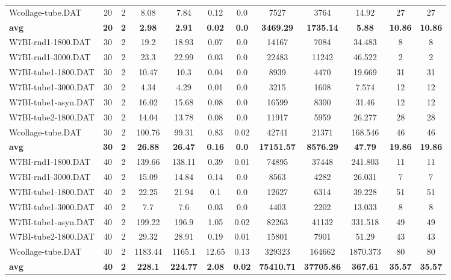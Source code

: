 \begin{table}[!h]
{\begin{tabular}{lccccccccccc}
Wcollage-tube.DAT & 20 & 2 & 8.08 & 7.84 & 0.12 & 0.0 & 7527 & 3764 & 14.92 & 27 & 27\\
\cline{1-12} \textbf{avg} & \textbf{20} & \textbf{2} & \textbf{2.98} & \textbf{2.91} & \textbf{0.02} & \textbf{0.0} & \textbf{3469.29} & \textbf{1735.14} & \textbf{5.88} & \textbf{10.86} & \textbf{10.86} \\ \cline{1-12}
W7BI-rnd1-1800.DAT & 30 & 2 & 19.2 & 18.93 & 0.07 & 0.0 & 14167 & 7084 & 34.483 & 8 & 8\\
W7BI-rnd1-3000.DAT & 30 & 2 & 23.3 & 22.99 & 0.03 & 0.0 & 22483 & 11242 & 46.522 & 2 & 2\\
W7BI-tube1-1800.DAT & 30 & 2 & 10.47 & 10.3 & 0.04 & 0.0 & 8939 & 4470 & 19.669 & 31 & 31\\
W7BI-tube1-3000.DAT & 30 & 2 & 4.34 & 4.29 & 0.01 & 0.0 & 3215 & 1608 & 7.574 & 12 & 12\\
W7BI-tube1-asyn.DAT & 30 & 2 & 16.02 & 15.68 & 0.08 & 0.0 & 16599 & 8300 & 31.46 & 12 & 12\\
W7BI-tube2-1800.DAT & 30 & 2 & 14.04 & 13.78 & 0.08 & 0.0 & 11917 & 5959 & 26.277 & 28 & 28\\
Wcollage-tube.DAT & 30 & 2 & 100.76 & 99.31 & 0.83 & 0.02 & 42741 & 21371 & 168.546 & 46 & 46\\
\cline{1-12} \textbf{avg} & \textbf{30} & \textbf{2} & \textbf{26.88} & \textbf{26.47} & \textbf{0.16} & \textbf{0.0} & \textbf{17151.57} & \textbf{8576.29} & \textbf{47.79} & \textbf{19.86} & \textbf{19.86} \\ \cline{1-12}
W7BI-rnd1-1800.DAT & 40 & 2 & 139.66 & 138.11 & 0.39 & 0.01 & 74895 & 37448 & 241.803 & 11 & 11\\
W7BI-rnd1-3000.DAT & 40 & 2 & 15.09 & 14.84 & 0.14 & 0.0 & 8563 & 4282 & 26.031 & 7 & 7\\
W7BI-tube1-1800.DAT & 40 & 2 & 22.25 & 21.94 & 0.1 & 0.0 & 12627 & 6314 & 39.228 & 51 & 51\\
W7BI-tube1-3000.DAT & 40 & 2 & 7.7 & 7.6 & 0.03 & 0.0 & 4403 & 2202 & 13.033 & 8 & 8\\
W7BI-tube1-asyn.DAT & 40 & 2 & 199.22 & 196.9 & 1.05 & 0.02 & 82263 & 41132 & 331.518 & 49 & 49\\
W7BI-tube2-1800.DAT & 40 & 2 & 29.32 & 28.91 & 0.19 & 0.01 & 15801 & 7901 & 51.29 & 43 & 43\\
Wcollage-tube.DAT & 40 & 2 & 1183.44 & 1165.1 & 12.65 & 0.13 & 329323 & 164662 & 1870.373 & 80 & 80\\
\cline{1-12} \textbf{avg} & \textbf{40} & \textbf{2} & \textbf{228.1} & \textbf{224.77} & \textbf{2.08} & \textbf{0.02} & \textbf{75410.71} & \textbf{37705.86} & \textbf{367.61} & \textbf{35.57} & \textbf{35.57} \\ \cline{1-12}

\end{tabular}}
\end{table}

